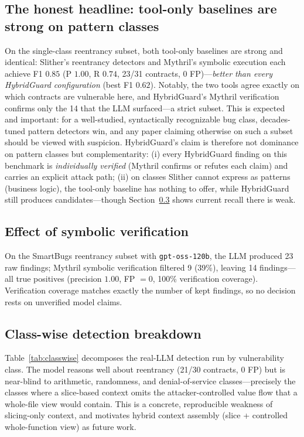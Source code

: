 \documentclass[conference]{IEEEtran}
\newcommand{\system}{HybridGuard}
\begin{document}
\subsection{The honest headline: tool-only baselines are strong on pattern classes}
On the single-class reentrancy subset, both tool-only baselines are strong and identical:
Slither's reentrancy detectors and Mythril's symbolic execution each achieve F1 $0.85$
(P $1.00$, R $0.74$, 23/31 contracts, 0 FP)---\emph{better than every \system{} configuration}
(best F1 $0.62$). Notably, the two tools agree exactly on which contracts are vulnerable here, and
\system{}'s Mythril verification confirms only the 14 that the LLM surfaced---a strict subset. This
is expected and important: for a well-studied, syntactically recognizable bug class, decades-tuned
pattern detectors win, and any paper claiming otherwise on such a subset should be viewed with
suspicion. \system{}'s claim is therefore not dominance on pattern classes but complementarity:
(i) every \system{} finding on this benchmark is \emph{individually verified} (Mythril confirms or
refutes each claim) and carries an explicit attack path; (ii) on classes Slither cannot express as
patterns (business logic), the tool-only baseline has nothing to offer, while \system{} still
produces candidates---though Section~\ref{sec:classwise} shows current recall there is weak.


\subsection{Effect of symbolic verification}
On the SmartBugs reentrancy subset with \texttt{gpt-oss-120b}, the LLM produced 23 raw findings;
Mythril symbolic verification filtered 9 (39\%), leaving 14 findings---all true positives
(precision $1.00$, FP $= 0$, 100\% verification coverage). Verification coverage matches exactly
the number of kept findings, so no decision rests on unverified model claims.

\subsection{Class-wise detection breakdown}\label{sec:classwise}
Table~\ref{tab:classwise} decomposes the real-LLM detection run by vulnerability class. The model
reasons well about reentrancy (21/30 contracts, 0 FP) but is near-blind to arithmetic, randomness,
and denial-of-service classes---precisely the classes where a slice-based context omits the
attacker-controlled value flow that a whole-file view would contain. This is a concrete,
reproducible weakness of slicing-only context, and motivates hybrid context assembly (slice +
controlled whole-function view) as future work.
\end{document}
